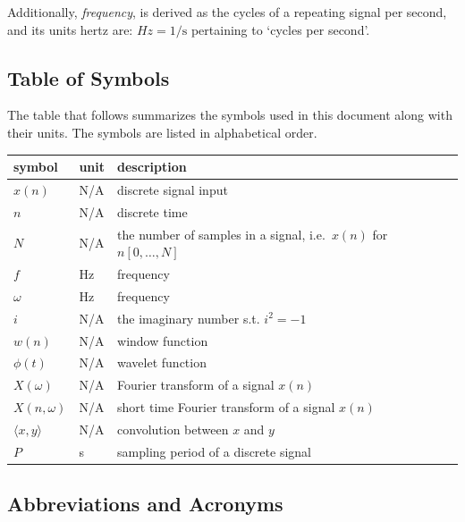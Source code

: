 \documentclass[12pt]{article}
\begin{document}
Additionally, \emph{frequency}, is derived as the cycles of a repeating signal per second, and its units hertz are: $Hz = 1/\si{\second}$ pertaining to `cycles per second'. 


\subsection{Table of Symbols}

The table that follows summarizes the symbols used in this document along with
their units. The symbols are listed in alphabetical order.

\renewcommand{\arraystretch}{1.2}
\noindent \begin{longtable*}{l l p{12cm}} \toprule
\textbf{symbol} & \textbf{unit} & \textbf{description}\\
\midrule 
$x(n)$ & N/A & discrete signal input
\\
$n$ & N/A & discrete time
\\
$N$ & N/A & the number of samples in a signal, i.e.\ $x(n)$ for $n[0,\dots, N]$
\\
$f$ & Hz & frequency 
\\  
$\omega$ & Hz & frequency
\\ 
$i$ & N/A & the imaginary number s.t. $i^2 = -1$
\\
$w(n)$ & N/A & window function
\\
$\phi(t)$ & N/A & wavelet function 
\\
$X(\omega)$ & N/A & Fourier transform of a signal $x(n)$
\\
$X(n,\omega)$ & N/A & short time Fourier transform of a signal $x(n)$
\\
$\langle x, y \rangle$& N/A & convolution between $x$ and $y$
\\
$P$ & \si{\second} & sampling period of a discrete signal
\\
\bottomrule
\end{longtable*}


\subsection{Abbreviations and Acronyms}
\end{document}
